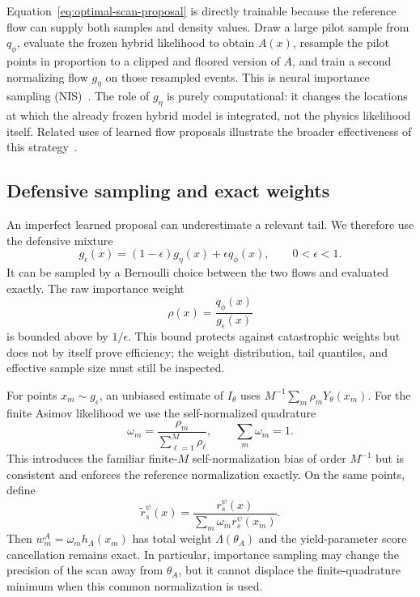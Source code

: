 \documentclass[
  aps,
  prd,
  superscriptaddress,
  nofootinbib,
  longbibliography,
  12pt
]{revtex4-2}
\newcommand{\qRef}{q_{\phi}}
\begin{document}
Equation~\eqref{eq:optimal-scan-proposal} is directly trainable because the reference flow can supply both samples and density values.  Draw a large pilot sample from $\qRef$, evaluate the frozen hybrid likelihood to obtain $A(x)$, resample the pilot points in proportion to a clipped and floored version of $A$, and train a second normalizing flow $g_\eta$ on those resampled events.  This is neural importance sampling (NIS)~\cite{muller2019neuralimportance}.  The role of $g_\eta$ is purely computational: it changes the locations at which the already frozen hybrid model is integrated, not the physics likelihood itself.  Related uses of learned flow proposals illustrate the broader effectiveness of this strategy~\cite{Butter:2025spinup}.

\subsection{Defensive sampling and exact weights}

An imperfect learned proposal can underestimate a relevant tail.  We therefore use the defensive mixture
\begin{equation}
  g_\epsilon(x)
  =(1-\epsilon)g_\eta(x)+\epsilon\qRef(x),
  \qquad 0<\epsilon<1.
  \label{eq:defensive-mixture}
\end{equation}
It can be sampled by a Bernoulli choice between the two flows and evaluated exactly.  The raw importance weight
\begin{equation}
  \rho(x)=\frac{\qRef(x)}{g_\epsilon(x)}
  \label{eq:raw-importance-weight}
\end{equation}
is bounded above by $1/\epsilon$.  This bound protects against catastrophic weights but does not by itself prove efficiency; the weight distribution, tail quantiles, and effective sample size must still be inspected.

For points $x_m\sim g_\epsilon$, an unbiased estimate of $I_\theta$ uses $M^{-1}\sum_m\rho_mY_\theta(x_m)$.  For the finite Asimov likelihood we use the self-normalized quadrature
\begin{equation}
  \omega_m
  =\frac{\rho_m}{\sum_{\ell=1}^{M}\rho_\ell},
  \qquad \sum_m\omega_m=1.
  \label{eq:self-normalized-weights}
\end{equation}
This introduces the familiar finite-$M$ self-normalization bias of order $M^{-1}$ but is consistent and enforces the reference normalization exactly.  On the same points, define
\begin{equation}
  \widetilde r_s^\psi(x)
  =\frac{r_s^\psi(x)}
  {\sum_m\omega_m r_s^\psi(x_m)}.
  \label{eq:nis-ratio-normalization}
\end{equation}
Then $w_m^A=\omega_mh_A(x_m)$ has total weight $\Lambda(\theta_A)$ and the yield-parameter score cancellation remains exact.  In particular, importance sampling may change the precision of the scan away from $\theta_A$, but it cannot displace the finite-quadrature minimum when this common normalization is used.
\end{document}
